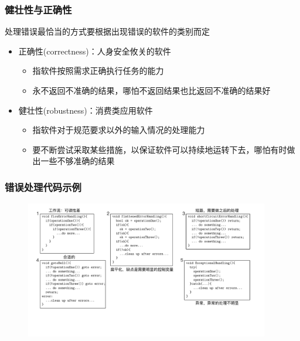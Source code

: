 \subsubsection{健壮性与正确性}
处理错误最恰当的方式要根据出现错误的软件的类别而定
\begin{itemize}
    \item 正确性(correctness)：人身安全攸关的软件
    \begin{itemize}
        \item 指软件按照需求正确执行任务的能力
        \item 永不返回不准确的结果，哪怕不返回结果也比返回不准确的结果好
    \end{itemize}
    \item 健壮性(robustness)：消费类应用软件
    \begin{itemize}
        \item 指软件对于规范要求以外的输入情况的处理能力
        \item 要不断尝试采取某些措施，以保证软件可以持续地运转下去，哪怕有时做出一些不够准确的结果
    \end{itemize}
\end{itemize}

\subsubsection{错误处理代码示例}
\begin{figure}[H]
    \vspace{-0.5em}
	\centering
	\includegraphics[width=0.95\textwidth]{images/错误处理代码示例.pdf}
    \vspace{-1em}
\end{figure}

